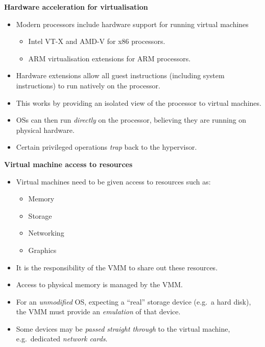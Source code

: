 \documentclass[11pt,a4paper]{article}
\begin{document}
\textbf{Hardware acceleration for virtualisation}
\begin{itemize}
    \item Modern processors include hardware support for running virtual machines
        \begin{itemize}
            \item Intel VT-X and AMD-V for x86 processors.
            \item ARM virtualisation extensions for ARM processors.
        \end{itemize}
    \item Hardware extensions allow all guest instructions (including system instructions)
        to run natively on the processor.
    \item This works by providing an isolated view of the processor to virtual machines.
    \item OSs can then run \emph{directly} on the processor, believing they are running on
        physical hardware.
    \item Certain privileged operations \emph{trap} back to the hypervisor.
\end{itemize}

\textbf{Virtual machine access to resources}
\begin{itemize}
    \item Virtual machines need to be given access to resources such as:
        \begin{itemize}
            \item Memory
            \item Storage
            \item Networking
            \item Graphics
        \end{itemize}
    \item It is the responsibility of the VMM to share out these resources.
    \item Access to physical memory is managed by the VMM.\
    \item For an \emph{unmodified} OS, expecting a ``real'' storage device (e.g.\ a hard disk),
        the VMM must provide an \emph{emulation} of that device.
    \item Some devices may be \emph{passed straight through} to the virtual machine,
        e.g.\ dedicated \emph{network cards}.
\end{itemize}
\end{document}
